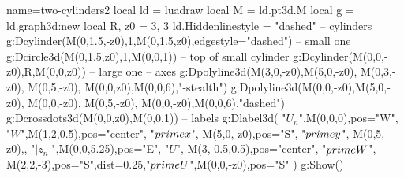 \documentclass[border=5pt]{standalone}%
\begin{document}
\begin{luadraw}{name=two-cylinders2}
local ld = luadraw
local M = ld.pt3d.M
local g = ld.graph3d:new{  }
local R, z0 = 3, 3
ld.Hiddenlinestyle = "dashed"
-- cylinders
g:Dcylinder(M(0,1.5,-z0),1,M(0,1.5,z0),{edgestyle="dashed"}) -- small one
g:Dcircle3d(M(0,1.5,z0),1,M(0,0,1)) -- top of small cylinder
g:Dcylinder(M(0,0,-z0),R,M(0,0,z0)) -- large one
-- axes
g:Dpolyline3d({{M(3,0,-z0),M(5,0,-z0)}, {M(0,3,-z0), M(0,5,-z0)}, {M(0,0,z0),M(0,0,6)}},"-stealth")
g:Dpolyline3d({{M(0,0,-z0),M(5,0,-z0)}, {M(0,0,-z0), M(0,5,-z0)}, {M(0,0,-z0),M(0,0,6)}},"dashed")
g:Dcrossdots3d({M(0,0,z0),M(0,0,1)})
-- labels
g:Dlabel3d( "$U_n$",M(0,0,0),{pos="W"}, "$W$",M(1,2,0.5),{pos="center"}, 
   "$\\prime x$", M(5,0,-z0),{pos="S"}, "$\\prime y$", M(0,5,-z0),{},
    "$|z_n|$",M(0,0,5.25),{pos="E"}, "$U$", M(3,-0.5,0.5),{pos="center"},
    "$\\prime W$", M(2,2,-3),{pos="S",dist=0.25},"$\\prime U$",M(0,0,-z0),{pos="S"} )
g:Show()
\end{luadraw}
\end{document}
